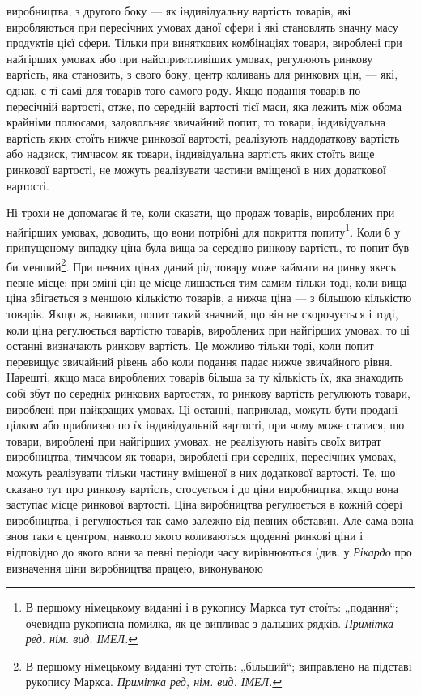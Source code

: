 \parcont{}  %
виробництва, з другого боку — як індивідуальну вартість товарів,
які виробляються при пересічних умовах даної сфери і які становлять
значну масу продуктів цієї сфери. Тільки при виняткових
комбінаціях товари, вироблені при найгірших умовах або
при найсприятливіших умовах, регулюють ринкову вартість, яка становить,
з свого боку, центр коливань для ринкових цін, —
які, однак, є ті самі для товарів того самого роду. Якщо подання
товарів по пересічній вартості, отже, по середній вартості
тієї маси, яка лежить між обома крайніми полюсами,
задовольняє звичайний попит, то товари, індивідуальна вартість
яких стоїть нижче ринкової вартості, реалізують наддодаткову
вартість або надзиск, тимчасом як товари, індивідуальна вартість
яких стоїть вище ринкової вартості, не можуть реалізувати
частини вміщеної в них додаткової вартості.

Ні трохи не допомагає й те, коли сказати, що продаж товарів,
вироблених при найгірших умовах, доводить, що вони
потрібні для покриття попиту\footnote*{
В першому німецькому виданні і в рукопису Маркса тут стоїть: „подання“;
очевидна рукописна помилка, як це випливає з дальших рядків. \emph{Примітка
ред. нім. вид. ІМЕЛ.}
}. Коли б у припущеному випадку
ціна була вища за середню ринкову вартість, то попит був би
менший\footnote*{
В першому німецькому виданні тут стоїть: „більший“; виправлено на
підставі рукопису Маркса. \emph{Примітка ред, нім. вид. ІМЕЛ.}
}. При певних цінах даний рід товару може займати
на ринку якесь певне місце; при зміні цін це місце лишається
тим самим тільки тоді, коли вища ціна збігається з меншою
кількістю товарів, а нижча ціна — з більшою кількістю товарів.
Якщо ж, навпаки, попит такий значний, що він не скорочується
і тоді, коли ціна регулюється вартістю товарів, вироблених при
найгірших умовах, то ці останні визначають ринкову вартість.
Це можливо тільки тоді, коли попит перевищує звичайний рівень
або коли подання падає нижче звичайного рівня. Нарешті,
якщо маса вироблених товарів більша за ту кількість їх, яка
знаходить собі збут по середніх ринкових вартостях, то ринкову
вартість регулюють товари, вироблені при найкращих
умовах. Ці останні, наприклад, можуть бути продані цілком або
приблизно по їх індивідуальній вартості, при чому може статися,
що товари, вироблені при найгірших умовах, не реалізують навіть
своїх витрат виробництва, тимчасом як товари, вироблені
при середніх, пересічних умовах, можуть реалізувати тільки частину
вміщеної в них додаткової вартості. Те, що сказано тут
про ринкову вартість, стосується і до ціни виробництва, якщо
вона заступає місце ринкової вартості. Ціна виробництва регулюється
в кожній сфері виробництва, і регулюється так само
залежно від певних обставин. Але сама вона знов таки є центром,
навколо якого коливаються щоденні ринкові ціни і відповідно
до якого вони за певні періоди часу вирівнюються (див.
у \emph{Рікардо} про визначення ціни виробництва працею, виконуваною
\parbreak{}  %
